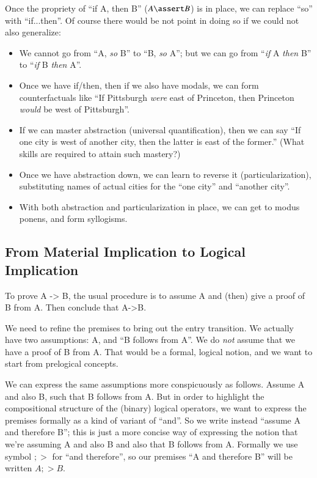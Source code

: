 \documentclass{article}
\begin{document}
Once the propriety of ``if A, then B'' (\(A\linfer B\)) is in place, we can replace ``so''
with ``if...then''. Of course there would be not point in doing so if
we could not also generalize:

\begin{itemize}
\item We cannot go from ``A, \textit{so} B'' to ``B, \textit{so} A'';
  but we can go from ``\textit{if} A \textit{then} B'' to
  ``\textit{if} B \textit{then} A''.
  \item Once we have if/then, then if we also have modals, we can form
    counterfactuals like ``If Pittsburgh \textit{were} east of
    Princeton, then Princeton \textit{would} be west of Pittsburgh''.
  \item If we can master abstraction (universal quantification), then
    we can say ``If one city is west of another city, then the latter
    is east of the former.'' (What skills are required to attain such
    mastery?)
  \item Once we have abstraction down, we can learn to reverse it
    (particularization), substituting names of actual cities for the
    ``one city'' and ``another city''.
    \item With both abstraction and particularization in place, we can
      get to modus ponens, and form syllogisms.
\end{itemize}

\subsection{From Material Implication to Logical Implication}

To prove A -> B, the usual procedure is to assume A and (then) give a
proof of B from A. Then conclude that A->B.

We need to refine the premises to bring out the entry transition. We
actually have two assumptions: A, and ``B follows from A''. We do
\textit{not} assume that we have a proof of B from A. That would be a
formal, logical notion, and we want to start from prelogical concepts.

We can express the same assumptions more conspicuously as follows.
Assume A and also B, such that B follows from A. But in order to
highlight the compositional structure of the (binary) logical
operators, we want to express the premises formally as a kind of
variant of ``and''. So we write instead ``assume A and therefore B'';
this is just a more concise way of expressing the notion that we're
assuming A and also B and also that B follows from A. Formally we use
symbol \(;>\) for ``and therefore'', so our premises ``A and therefore
B'' will be written \(A ;> B\).
\end{document}
